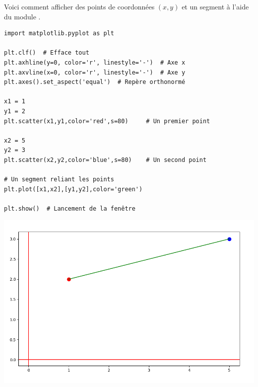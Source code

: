 \documentclass[11pt,class=report,crop=false]{standalone}
\begin{document}

\begin{cours}


Voici comment afficher des points de coordonnées $(x,y)$ et un segment à l'aide du module .

\begin{center}
\begin{minipage}{0.85\textwidth}
\begin{lstlisting}
import matplotlib.pyplot as plt

plt.clf()  # Efface tout
plt.axhline(y=0, color='r', linestyle='-')  # Axe x
plt.axvline(x=0, color='r', linestyle='-')  # Axe y
plt.axes().set_aspect('equal')  # Repère orthonormé

x1 = 1
y1 = 2
plt.scatter(x1,y1,color='red',s=80)     # Un premier point

x2 = 5
y2 = 3
plt.scatter(x2,y2,color='blue',s=80)    # Un second point

# Un segment reliant les points
plt.plot([x1,x2],[y1,y2],color='green')  

plt.show()  # Lancement de la fenêtre
\end{lstlisting} 
\end{minipage}
\end{center}

\begin{center}
\includegraphics[scale=\myscale,scale=0.4]{ecran-complexes1-cours}
\end{center}	 

\end{cours}
\end{document}
